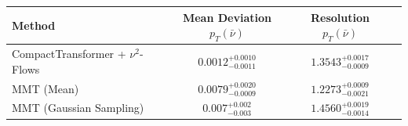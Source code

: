     \begin{tabular}{lccc}
        \toprule
        Method & Mean Deviation $p_{T}(\bar{\nu})$ & Resolution $p_{T}(\bar{\nu})$ \\
        \midrule
        CompactTransformer + $\nu^2$-Flows & $0.0012^{+0.0010}_{-0.0011}$ & $1.3543^{+0.0017}_{-0.0009}$ \\
        MMT (Mean) & $0.0079^{+0.0020}_{-0.0009}$ & $1.2273^{+0.0009}_{-0.0021}$ \\
        MMT (Gaussian Sampling) & $0.007^{+0.002}_{-0.003}$ & $1.4560^{+0.0019}_{-0.0014}$ \\
        \bottomrule
    \end{tabular}